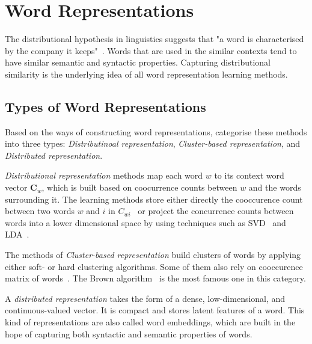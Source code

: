 \section{Word Representations}
\label{wordrep}
The distributional hypothesis in linguistics suggests that "a word is characterised by the company it keeps"~\cite{firth1957}. Words that are used in the similar contexts tend to have similar semantic and syntactic properties. Capturing distributional similarity is the underlying idea of all word representation learning methods. 

\subsection{Types of Word Representations}
Based on the ways of constructing word representations,  categorise these methods into three types: \textit{Distributinoal representation},  \textit{Cluster-based representation}, and \textit{Distributed representation}.

\textit{Distributional representation} methods map each word $w$ to its context word vector $\mathbf{C}_w$, which is built based on coocurrence counts between $w$ and the words surrounding it. The learning methods store either directly the cooccurence count between two words $w$ and $i$ in $C_{wi}$~\cite{} or project the concurrence counts between words into a lower dimensional space by using techniques such as SVD~\cite{} and LDA~\cite{}. 

The methods of \textit{Cluster-based representation} build clusters of words by applying either soft- or hard clustering algorithms. Some of them also rely on cooccurence matrix of words~\cite{}. The Brown algorithm~\cite{Brown92class-basedn-gram} is the most famous one in this category.

A \textit{distributed representation} takes the form of a dense, low-dimensional, and continuous-valued vector. It is compact and stores latent features of a word. This kind of representations are also called word embeddings, which are built in the hope of capturing both syntactic and semantic properties of words.

